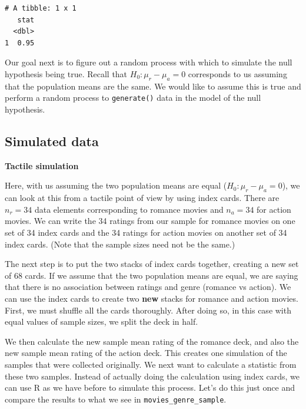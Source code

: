 \documentclass[12pt,]{krantz}
\makeatletter
\newenvironment{Shaded}{\begin{snugshade}}{\end{snugshade}}
\newcommand{\KeywordTok}[1]{\textcolor[rgb]{0.27,0.27,0.27}{\textbf{#1}}}
\newcommand{\DataTypeTok}[1]{\textcolor[rgb]{0.27,0.27,0.27}{#1}}
\newcommand{\StringTok}[1]{\textcolor[rgb]{0.5,0.5,0.5}{#1}}
\newcommand{\CommentTok}[1]{\textcolor[rgb]{0.37,0.37,0.37}{\textit{#1}}}
\newcommand{\OperatorTok}[1]{\textcolor[rgb]{0.43,0.43,0.43}{\textbf{#1}}}
\newcommand{\NormalTok}[1]{#1}
\newenvironment{kframe}{%
\medskip{}
\setlength{\fboxsep}{.8em}
 \def\at@end@of@kframe{}%
 \ifinner\ifhmode%
  \def\at@end@of@kframe{\end{minipage}}%
  \begin{minipage}{\columnwidth}%
 \fi\fi%
 \def\FrameCommand##1{\hskip\@totalleftmargin \hskip-\fboxsep
 \colorbox{shadecolor}{##1}\hskip-\fboxsep
     \hskip-\linewidth \hskip-\@totalleftmargin \hskip\columnwidth}%
 \MakeFramed {\advance\hsize-\width
   \@totalleftmargin\z@ \linewidth\hsize
   \@setminipage}}%
 {\par\unskip\endMakeFramed%
 \at@end@of@kframe}
\renewenvironment{Shaded}{\begin{kframe}}{\end{kframe}}
\theoremstyle{definition}
\theoremstyle{definition}
\theoremstyle{definition}
\theoremstyle{remark}
\makeatother
\begin{document}
\begin{verbatim}
# A tibble: 1 x 1
   stat
  <dbl>
1  0.95
\end{verbatim}

Our goal next is to figure out a random process with which to simulate
the null hypothesis being true. Recall that \(H_0: \mu_r - \mu_a = 0\)
corresponds to us assuming that the population means are the same. We
would like to assume this is true and perform a random process to
\texttt{generate()} data in the model of the null hypothesis.

\subsection{Simulated data}\label{simulated-data}

\textbf{Tactile simulation}

Here, with us assuming the two population means are equal
(\(H_0: \mu_r - \mu_a = 0\)), we can look at this from a tactile point
of view by using index cards. There are \(n_r = 34\) data elements
corresponding to romance movies and \(n_a = 34\) for action movies. We
can write the 34 ratings from our sample for romance movies on one set
of 34 index cards and the 34 ratings for action movies on another set of
34 index cards. (Note that the sample sizes need not be the same.)

The next step is to put the two stacks of index cards together, creating
a new set of 68 cards. If we assume that the two population means are
equal, we are saying that there is no association between ratings and
genre (romance vs action). We can use the index cards to create two
\textbf{new} stacks for romance and action movies. First, we must
shuffle all the cards thoroughly. After doing so, in this case with
equal values of sample sizes, we split the deck in half.

We then calculate the new sample mean rating of the romance deck, and
also the new sample mean rating of the action deck. This creates one
simulation of the samples that were collected originally. We next want
to calculate a statistic from these two samples. Instead of actually
doing the calculation using index cards, we can use R as we have before
to simulate this process. Let's do this just once and compare the
results to what we see in \texttt{movies\_genre\_sample}.

\begin{Shaded}
\end{Shaded}
\end{document}
